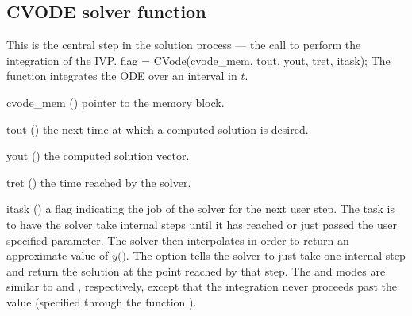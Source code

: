 \subsection{CVODE solver function}\label{sss:cvode}

This is the central step in the solution process --- the call to
perform the integration of the IVP.
%
{
  flag = CVode(cvode\_mem, tout, yout, tret, itask);
}
{
  The function  integrates the ODE over an interval in $t$.
}
{
  \begin{args}
  \item[cvode\_mem] ()
    pointer to the {\cvode} memory block.
  \item[tout] ()
    the next time at which a computed solution is desired.
  \item[yout] ()
    the computed solution vector.
  \item[tret] ()
    the time reached by the solver.
  \item[itask] ()
    a flag indicating the job of the solver for the next user step. 
    The  task is to have the solver take internal steps until   
    it has reached or just passed the user specified 
    parameter. The solver then interpolates in order to   
    return an approximate value of $y($$)$. 
    The  option tells the solver to just take one internal step  
    and return the solution at the point reached by that step. 
    The  and  modes are     
    similar to  and , respectively, except    
    that the integration never proceeds past the value      
     (specified through the function ).
  \end{args}
}
